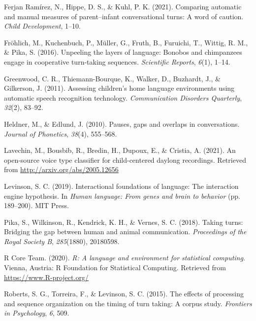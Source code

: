 \documentclass[10pt, letterpaper]{article}
\begin{document}
\leavevmode\hypertarget{ref-ferjan2021comparing}{}%
Ferjan Ramírez, N., Hippe, D. S., \& Kuhl, P. K. (2021). Comparing
automatic and manual measures of parent--infant conversational turns: A
word of caution. \emph{Child Development}, 1--10.

\leavevmode\hypertarget{ref-frohlich2016unpeeling}{}%
Fröhlich, M., Kuchenbuch, P., Müller, G., Fruth, B., Furuichi, T.,
Wittig, R. M., \& Pika, S. (2016). Unpeeling the layers of language:
Bonobos and chimpanzees engage in cooperative turn-taking sequences.
\emph{Scientific Reports}, \emph{6}(1), 1--14.

\leavevmode\hypertarget{ref-LENA}{}%
Greenwood, C. R., Thiemann-Bourque, K., Walker, D., Buzhardt, J., \&
Gilkerson, J. (2011). Assessing children's home language environments
using automatic speech recognition technology. \emph{Communication
Disorders Quarterly}, \emph{32}(2), 83--92.

\leavevmode\hypertarget{ref-heldner2010pauses}{}%
Heldner, M., \& Edlund, J. (2010). Pauses, gaps and overlaps in
conversations. \emph{Journal of Phonetics}, \emph{38}(4), 555--568.

\leavevmode\hypertarget{ref-lavechin2021vtc}{}%
Lavechin, M., Bousbib, R., Bredin, H., Dupoux, E., \& Cristia, A.
(2021). An open-source voice type classifier for child-centered daylong
recordings. Retrieved from \url{http://arxiv.org/abs/2005.12656}

\leavevmode\hypertarget{ref-levinson2019interactional}{}%
Levinson, S. C. (2019). Interactional foundations of language: The
interaction engine hypothesis. In \emph{Human language: From genes and
brain to behavior} (pp. 189--200). MIT Press.

\leavevmode\hypertarget{ref-pika2018taking}{}%
Pika, S., Wilkinson, R., Kendrick, K. H., \& Vernes, S. C. (2018).
Taking turns: Bridging the gap between human and animal communication.
\emph{Proceedings of the Royal Society B}, \emph{285}(1880), 20180598.

\leavevmode\hypertarget{ref-R}{}%
R Core Team. (2020). \emph{R: A language and environment for statistical
computing}. Vienna, Austria: R Foundation for Statistical Computing.
Retrieved from \url{https://www.R-project.org/}

\leavevmode\hypertarget{ref-roberts2015effects}{}%
Roberts, S. G., Torreira, F., \& Levinson, S. C. (2015). The effects of
processing and sequence organization on the timing of turn taking: A
corpus study. \emph{Frontiers in Psychology}, \emph{6}, 509.
\end{document}
